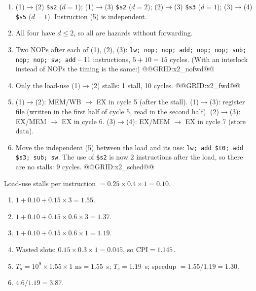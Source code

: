 \documentclass[11pt]{article}
\begin{document}
\begin{solution}[\ref{x:hazards}]
\leavevmode
\begin{enumerate}[label=(\alph*),leftmargin=*]
  \item (1)$\to$(2) \texttt{\$s2} ($d=1$); (1)$\to$(3) \texttt{\$s2} ($d=2$);
  (2)$\to$(3) \texttt{\$s3} ($d=1$); (3)$\to$(4) \texttt{\$s5} ($d=1$).
  Instruction (5) is independent.
  \item All four have $d\le2$, so all are hazards without forwarding.
  \item Two NOPs after each of (1), (2), (3):
  \texttt{lw; nop; nop; add; nop; nop; sub; nop; nop; sw; add} -- 11
  instructions, $5+10 = 15$ cycles. (With an interlock instead of NOPs the
  timing is the same:)
@@GRID:x2_nofwd@@
  \item Only the load-use (1)$\to$(2) stalls: 1 stall, 10 cycles.
@@GRID:x2_fwd@@
  \item (1)$\to$(2): MEM/WB $\to$ EX in cycle 5 (after the stall).
  (1)$\to$(3): register file (written in the first half of cycle 5, read in
  the second half). (2)$\to$(3): EX/MEM $\to$ EX in cycle 6. (3)$\to$(4):
  EX/MEM $\to$ EX in cycle 7 (store data).
  \item Move the independent (5) between the load and its use:
  \texttt{lw; add \$t0; add \$s3; sub; sw}. The use of \texttt{\$s2} is now
  2 instructions after the load, so there are no stalls: 9 cycles.
@@GRID:x2_sched@@
\end{enumerate}
\end{solution}

\begin{solution}[\ref{x:branches}]
Load-use stalls per instruction $= 0.25\times0.4\times1 = 0.10$.
\begin{enumerate}[label=(\alph*),leftmargin=*]
  \item $1 + 0.10 + 0.15\times3 = 1.55$.
  \item $1 + 0.10 + 0.15\times0.6\times3 = 1.37$.
  \item $1 + 0.10 + 0.15\times0.6\times1 = 1.19$.
  \item Wasted slots: $0.15\times0.3\times1 = 0.045$, so $\mathrm{CPI} = 1.145$.
  \item $T_a = 10^9\times1.55\times1\text{ ns} = 1.55$~s; $T_c = 1.19$~s;
  speedup $= 1.55/1.19 = 1.30$.
  \item $4.6/1.19 = 3.87$.
\end{enumerate}
\end{solution}
\end{document}
